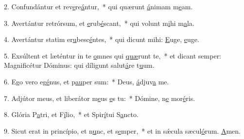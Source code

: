 2. Confundántur et rev\uline{e}re\uline{á}ntur,~* qui quærunt \uline{á}nimam m\uline{e}am.\par 
3. Avertántur retrórsum, et \uline{e}rub\uline{é}scant,~* qui volunt m\uline{i}hi m\uline{a}la.\par 
4. Avertántur statim er\uline{u}besc\uline{é}ntes,~* qui dicunt mihi: \uline{E}uge, \uline{e}uge.\par 
5. Exsúltent et læténtur in te \uline{o}mnes qui \uline{quæ}runt te,~* et dicant semper: Magnificétur Dóminus: qui díligunt salut\uline{á}re t\uline{u}um.\par 
6. Ego vero eg\uline{é}nus, et p\uline{au}per sum:~* Deus, \uline{á}djuv\uline{a} me.\par 
7. Adjútor meus, et liberátor m\uline{e}us \uline{e}s tu:~* Dómine, n\uline{e} mor\uline{é}ris.\par 
8. Glória P\uline{a}tri, et F\uline{í}lio,~* et Spir\uline{í}tui S\uline{a}ncto.\par 
9. Sicut erat in princípio, et n\uline{u}nc, et s\uline{e}mper,~* et in sǽcula sæcul\uline{ó}rum. \uline{A}men.\par 
